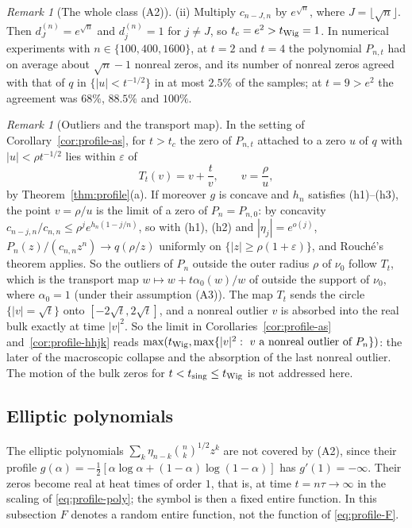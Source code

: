 \documentclass[11pt]{amsart}
\theoremstyle{definition}
\theoremstyle{remark}
\newtheorem{remark}[theorem]{Remark}
\numberwithin{equation}{section}
\newcommand{\eps}{\varepsilon}
\begin{document}
\begin{remark}[The whole class (A2)]
(ii) Multiply $c_{n-J,n}$ by $e^{\sqrt n}$, where $J=\lfloor\sqrt n\rfloor$. Then $d^{(n)}_J=e^{\sqrt n}$ and $d^{(n)}_j=1$ for $j\ne J$, so $t_c=e^2>t_{\rm Wig}=1$. In numerical experiments with $n\in\{100,400,1600\}$, at $t=2$ and $t=4$ the polynomial $P_{n,t}$ had on average about $\sqrt n-1$ nonreal zeros, and its number of nonreal zeros agreed with that of $q$ in $\{|u|<t^{-1/2}\}$ in at most $2.5\%$ of the samples; at $t=9>e^2$ the agreement was $68\%$, $88.5\%$ and $100\%$.
\end{remark}

\begin{remark}[Outliers and the transport map]\label{rem:profile-transport}
In the setting of Corollary~\ref{cor:profile-as}, for $t>t_c$ the zero of $P_{n,t}$ attached to a zero $u$ of $q$ with $|u|<\rho t^{-1/2}$ lies within $\eps$ of
\[
T_t(v)=v+\frac tv,\qquad v=\frac\rho u ,
\]
by Theorem~\ref{thm:profile}(a). If moreover $g$ is concave and $h_n$ satisfies (h1)--(h3), the point $v=\rho/u$ is the limit of a zero of $P_n=P_{n,0}$: by concavity $c_{n-j,n}/c_{n,n}\le\rho^je^{h_n(1-j/n)}$, so with (h1), (h2) and $|\eta_j|=e^{o(j)}$, $P_n(z)/(c_{n,n}z^n)\to q(\rho/z)$ uniformly on $\{|z|\ge\rho(1+\eps)\}$, and Rouch\'e's theorem applies. So the outliers of $P_n$ outside the outer radius $\rho$ of $\nu_0$ follow $T_t$, which is the transport map $w\mapsto w+t\alpha_0(w)/w$ of \cite[Definition~3.1 and Theorem~3.3]{HHJK} outside the support of $\nu_0$, where $\alpha_0=1$ (under their assumption (A3)). The map $T_t$ sends the circle $\{|v|=\sqrt t\}$ onto $[-2\sqrt t,2\sqrt t]$, and a nonreal outlier $v$ is absorbed into the real bulk exactly at time $|v|^2$. So the limit in Corollaries~\ref{cor:profile-as} and~\ref{cor:profile-hhjk} reads $\max(t_{\rm Wig},\max\{|v|^2:\ v\text{ a nonreal outlier of }P_n\})$: the later of the macroscopic collapse and the absorption of the last nonreal outlier. The motion of the bulk zeros for $t<t_{\rm sing}\le t_{\rm Wig}$ \cite[Conjecture~3.7 and Open Problem~3.8]{HHJK} is not addressed here.
\end{remark}

\subsection{Elliptic polynomials}\label{subsec:elliptic}
The elliptic polynomials $\sum_k\eta_{n-k}\binom nk^{1/2}z^k$ are not covered by (A2), since their profile $g(\alpha)=-\frac12[\alpha\log\alpha+(1-\alpha)\log(1-\alpha)]$ has $g'(1)=-\infty$. Their zeros become real at heat times of order $1$, that is, at time $t=n\tau\to\infty$ in the scaling of \eqref{eq:profile-poly}; the symbol is then a fixed entire function. In this subsection $F$ denotes a random entire function, not the function of \eqref{eq:profile-F}.
\end{document}
